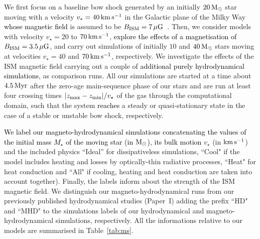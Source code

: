 \documentclass[useAMS,usenatbib]{mn2e}
\begin{document}
We first focus on a baseline bow shock generated by an initially 
$20\, \rm M_{\odot}$ star moving with a velocity $v_{\star}=40\, \rm km\, \rm s^{-1}$ in
the Galactic plane of the Milky Way \textcolor{black}{whose magnetic field} is assumed to be $B_{\rm
ISM}=7\, \mu \rm G$~\citep{draine_piim_bool_2011}. Then, we consider models with velocity $v_{\star}=20$ to 
$70\, \rm km\, \rm s^{-1}$, \textcolor{black}{explore the effects of a magnetisation
of $B_{\rm ISM}=3.5\, \mu \rm G$}, and carry out simulations 
of initially $10$ and $40\, \rm M_{\odot}$ stars 
moving at velocities $v_{\star}=40$ and $70\, \rm km\, \rm s^{-1}$, respectively. 
We investigate the effects of the ISM magnetic field carrying out a couple of 
\textcolor{black}{additional purely hydrodynamical simulations}, as comparison runs. All our 
simulations are started at a time about $4.5\, \rm Myr$ 
after the zero-age main-sequence phase of our stars and are run at least 
four crossing times $|z_{\rm max}-z_{\rm min}|/v_{\star}$ of the gas through 
the computational domain, such that the system \textcolor{black}{reaches} a steady or quasi-stationary   
state in the case of a stable or unstable bow shock, respectively.   


\textcolor{black}{We label our magneto-hydrodynamical simulations concatenating 
the values of the initial mass $M_{\star}$ of the moving
star (in $\rm M_{\odot}$), its bulk motion} $v_{\star}$ (in $\rm km\,
\rm s^{-1}$) and the included physics ``Ideal'' for dissipativeless simulations,
``Cool" if the model includes heating and losses by optically-thin radiative
processes, ``Heat" for heat conduction and ``All" if cooling, heating and heat 
conduction are taken into account together). Finally, the labels inform about the
strength of the ISM magnetic field. We distinguish our magneto-hydrodynamical runs
from our previously published hydrodynamical studies (Paper~I) adding the prefix 
``HD" and ``MHD" to the simulations labels of our hydrodynamical and 
magneto-hydrodynamical simulations, respectively. All the informations 
relative to our models are summarised in Table~\ref{tab:ms}. 
\end{document}

